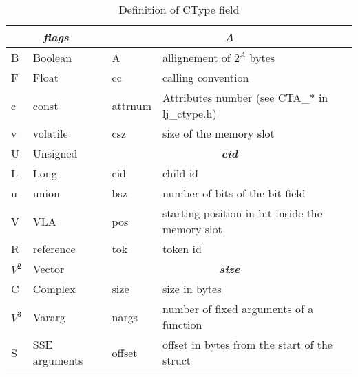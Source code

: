 \begin{table}[p]
\footnotesize
\centering
\caption{Definition of CType field}
\label{tab:ffi-ctype2}
\begin{tabular}{ll|l|l|}
\hline
\multicolumn{2}{|c|}{\textit{\textbf{flags}}} & \multicolumn{2}{c|}{\textit{\textbf{A}}}                                    \\ \hline
\multicolumn{1}{|l|}{B}      & Boolean        & A                      & allignement of $2^A$ bytes                         \\
\multicolumn{1}{|l|}{F}      & Float          & cc                     & calling convention                                 \\
\multicolumn{1}{|l|}{c}      & const          & attrnum                & Attributes number (see CTA\_* in lj\_ctype.h)      \\
\multicolumn{1}{|l|}{v}      & volatile       & csz                    & size of the memory slot                            \\ \cline{3-4}
\multicolumn{1}{|l|}{U}      & Unsigned       & \multicolumn{2}{c|}{\textit{\textbf{cid}}}                                  \\ \cline{3-4}
\multicolumn{1}{|l|}{L}      & Long           & cid                    & child id                                           \\
\multicolumn{1}{|l|}{u}      & union          & bsz                    & number of bits of the bit-field                    \\
\multicolumn{1}{|l|}{V}      & VLA            & pos                    & starting position in bit inside the memory slot    \\
\multicolumn{1}{|l|}{R}      & reference      & tok                    & token id                                           \\ \cline{3-4}
\multicolumn{1}{|l|}{$V^2$}  & Vector         & \multicolumn{2}{c|}{\textit{\textbf{size}}}                                 \\ \cline{3-4}
\multicolumn{1}{|l|}{C}      & Complex        & size                   & size in bytes                                      \\
\multicolumn{1}{|l|}{$V^3$}  & Vararg         & nargs                  & number of fixed arguments of a function            \\
\multicolumn{1}{|l|}{S}      & SSE arguments  & offset                 & offset in bytes from the start of the struct       \\ \cline{1-2}

\end{tabular}
\end{table}
